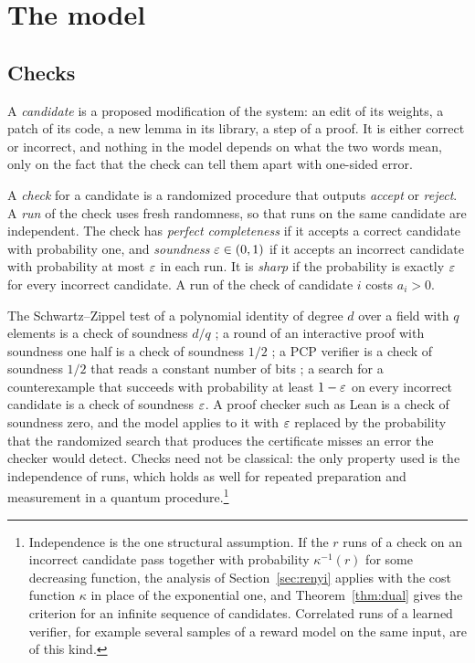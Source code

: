 \section{The model}\label{sec:model}

\subsection{Checks}

A \emph{candidate} is a proposed modification of the system: an edit of its weights, a patch of its code, a new lemma in its library, a step of a proof. It is either correct or incorrect, and nothing in the model depends on what the two words mean, only on the fact that the check can tell them apart with one-sided error.

\begin{definition}[Check]\label{def:check}
A \emph{check} for a candidate is a randomized procedure that outputs \emph{accept} or \emph{reject}. A \emph{run} of the check uses fresh randomness, so that runs on the same candidate are independent. The check has \emph{perfect completeness} if it accepts a correct candidate with probability one, and \emph{soundness} $\varepsilon\in(0,1)$ if it accepts an incorrect candidate with probability at most $\varepsilon$ in each run. It is \emph{sharp} if the probability is exactly $\varepsilon$ for every incorrect candidate. A run of the check of candidate $i$ costs $a_{i}>0$.
\end{definition}

The Schwartz--Zippel test of a polynomial identity of degree $d$ over a field with $q$ elements is a check of soundness $d/q$ \cite{Sch80,Zip79}; a round of an interactive proof with soundness one half is a check of soundness $1/2$ \cite{Bab85,GMR89}; a PCP verifier is a check of soundness $1/2$ that reads a constant number of bits \cite{AS98,ALM98}; a search for a counterexample that succeeds with probability at least $1-\varepsilon$ on every incorrect candidate is a check of soundness $\varepsilon$. A proof checker such as Lean \cite{MU21} is a check of soundness zero, and the model applies to it with $\varepsilon$ replaced by the probability that the randomized search that produces the certificate misses an error the checker would detect. Checks need not be classical: the only property used is the independence of runs, which holds as well for repeated preparation and measurement in a quantum procedure.\footnote{Independence is the one structural assumption. If the $r$ runs of a check on an incorrect candidate pass together with probability $\kappa^{-1}(r)$ for some decreasing function, the analysis of Section~\ref{sec:renyi} applies with the cost function $\kappa$ in place of the exponential one, and Theorem~\ref{thm:dual} gives the criterion for an infinite sequence of candidates. Correlated runs of a learned verifier, for example several samples of a reward model on the same input, are of this kind.}

